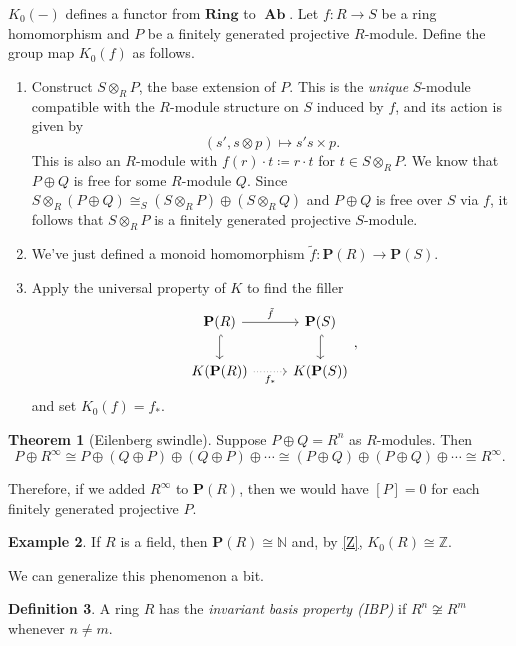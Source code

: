 \documentclass[10pt,letterpaper,cm]{nupset}
\theoremstyle{definition}
\newtheorem{definition}{Definition}[section]
\newtheorem{exmp}[definition]{Example}
\theoremstyle{theorem}
\newtheorem{theorem}[definition]{Theorem}
\theoremstyle{remark}
\newcommand{\N}{\mathbb N}
\renewcommand{\P}{\mathbf P}
\newcommand{\Z}{\mathbb Z}
\newcommand{\1}{\mathbf{1}}
\newcommand{\0}{\vec 0}
\DeclareMathOperator{\Ab}{\mathbf{Ab}}
\begin{document}
$K_0(-)$ defines a functor from $\mathbf{Ring}$ to $\Ab$. Let $f: R \to S$ be a ring homomorphism and $P$ be a finitely generated projective $R$-module. Define the group map $K_0(f)$ as follows.
\begin{enumerate}
\item Construct $S\otimes_R P$, the base extension of $P$. This is the \textit{unique} $S$-module  compatible with the $R$-module structure on $S$ induced by $f$, and its action is given by $$\left(s', s \otimes p\right) \mapsto  s's \times p.$$ This is also an $R$-module with $f(r) \cdot t \coloneqq r\cdot t$ for $t\in S \otimes_R P$. We know that $P \oplus Q$ is free for some $R$-module $Q$. Since $S\otimes_R (P \oplus Q) \cong_S (S \otimes_R P)\oplus (S \otimes_R Q)$ and $P\oplus Q$ is free over $S$ via $f$, it follows that  $S \otimes_R P$ is a finitely generated projective $S$-module.
\item We've just defined a monoid homomorphism $\tilde{f} : \P(R) \to \P(S)$.
\item Apply the universal property of $K$ to find the filler
\[
\begin{tikzcd}
\mathbf{P}(R) \arrow[d, hook] \arrow[r, "\tilde{f}"] & \mathbf{P}(S) \arrow[d, hook] \\
K(\mathbf{P}(R)) \arrow[r, "f_{\ast}"', dotted] & K(\mathbf{P}(S))
\end{tikzcd},
\]
and set $K_0(f) = f_{\ast}$.
\end{enumerate}

\smallskip

\begin{theorem}[Eilenberg swindle]
Suppose $P \oplus Q =R^n$ as $R$-modules. Then $$P \oplus R^{\infty} \cong P \oplus  (Q \oplus P) \oplus (Q \oplus P) \oplus \cdots \cong (P \oplus Q) \oplus (P \oplus Q) \oplus \cdots \cong R^{\infty}.$$
\end{theorem}

Therefore, if we added $R^{\infty}$ to $\P(R)$, then we would have $[P] = 0$ for each finitely generated projective $P$.

\smallskip

\begin{exmp}
If $R$ is a field, then $\P(R) \cong \N$ and, by \cref{Z}, $K_0(R) \cong \Z$. 
\end{exmp}

We can generalize this phenomenon a bit.

\begin{definition}
A ring $R$ has the \textit{invariant basis property (IBP)} if $R^n \not \cong R^m$ whenever $n \ne m$. 
\end{definition}
\end{document}
